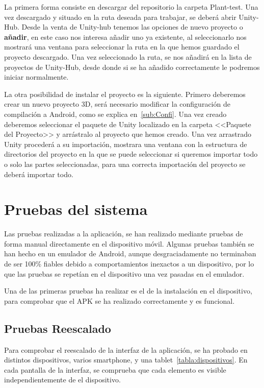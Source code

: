 La primera forma consiste en descargar del repositorio la carpeta Plant-test. Una vez descargado y situado en la ruta deseada para trabajar, se deberá abrir Unity-Hub. Desde la venta de Unity-hub tenemos las opciones de nuevo proyecto o \textbf{añadir}, en este caso nos interesa añadir uno ya existente, al seleccionarlo nos mostrará una ventana para seleccionar la ruta en la que hemos guardado el proyecto descargado. Una vez seleccionado la ruta, se nos añadirá en la lista de proyectos de Unity-Hub, desde donde si se ha añadido correctamente le podremos iniciar normalmente.


La otra posibilidad de instalar el proyecto es la siguiente. Primero deberemos crear un nuevo proyecto 3D, será necesario modificar la configuración de compilación a Android, como se explica en~\ref{sub:Confi}. Una vez creado deberemos seleccionar el paquete de Unity localizado en la carpeta <<Paquete del Proyecto>> y arrástralo al proyecto que hemos creado. Una vez arrastrado Unity procederá a su importación, mostrara una ventana con la estructura de directorios del proyecto en la que se puede seleccionar si queremos importar todo o solo las partes seleccionadas, para una correcta importación del proyecto se deberá importar todo.


\section{Pruebas del sistema}
Las pruebas realizadas a la aplicación, se han realizado mediante pruebas de forma manual directamente en el dispositivo móvil. Algunas pruebas también se han hecho en un emulador de Android, aunque desgraciadamente no terminaban de ser 100\% fiables debido a comportamientos inexactos a un dispositivo, por lo que las pruebas se repetían en el dispositivo una vez pasadas en el emulador. 

Una de las primeras pruebas ha realizar es el de la instalación en el dispositivo, para comprobar que el APK se ha realizado correctamente y es funcional. 

\subsection{Pruebas Reescalado}
Para comprobar el reescalado de la interfaz de la aplicación, se ha probado en distintos dispositivos, varios smartphone, y una tablet~\ref{tabla:dispositivos}. En cada pantalla de la interfaz, se comprueba que cada elemento es visible independientemente de el dispositivo.

